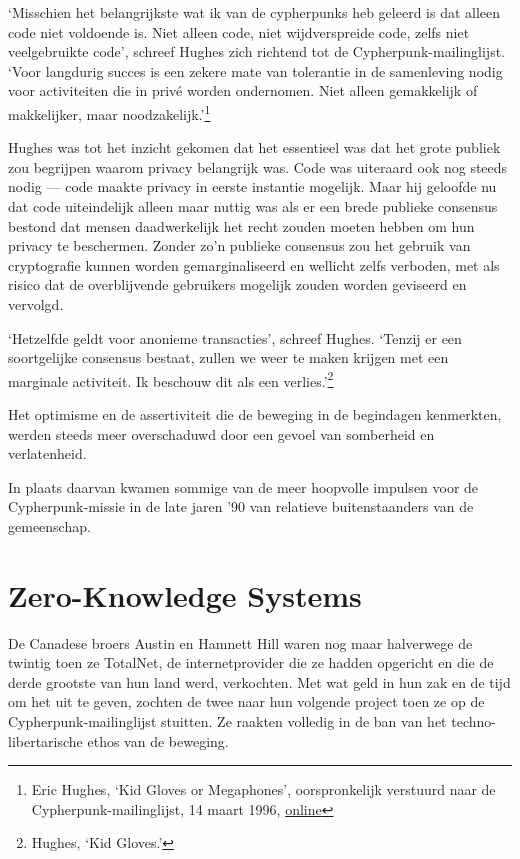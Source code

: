 \documentclass[
  a5paper,
  smalldemyvopaper,11pt,twoside,onecolumn,openright,extrafontsizes]{memoir}
\begin{document}
`Misschien het belangrijkste wat ik van de cypherpunks heb geleerd is
dat alleen code niet voldoende is. Niet alleen code, niet wijdverspreide
code, zelfs niet veelgebruikte code', schreef Hughes zich richtend tot
de Cypherpunk-mailinglijst. `Voor langdurig succes is een zekere mate
van tolerantie in de samenleving nodig voor activiteiten die in privé
worden ondernomen. Niet alleen gemakkelijk of makkelijker, maar
noodzakelijk.'\footnote{Eric Hughes, `Kid Gloves or Megaphones',
  oorspronkelijk verstuurd naar de Cypherpunk-mailinglijst, 14 maart
  1996,
  \href{https://cypherpunks.venona.com/date/1996/03/msg00932.html}{online}}

Hughes was tot het inzicht gekomen dat het essentieel was dat het grote
publiek zou begrijpen waarom privacy belangrijk was. Code was uiteraard
ook nog steeds nodig --- code maakte privacy in eerste instantie
mogelijk. Maar hij geloofde nu dat code uiteindelijk alleen maar nuttig
was als er een brede publieke consensus bestond dat mensen daadwerkelijk
het recht zouden moeten hebben om hun privacy te beschermen. Zonder zo'n
publieke consensus zou het gebruik van cryptografie kunnen worden
gemarginaliseerd en wellicht zelfs verboden, met als risico dat de
overblijvende gebruikers mogelijk zouden worden geviseerd en vervolgd.

`Hetzelfde geldt voor anonieme transacties', schreef Hughes. `Tenzij er
een soortgelijke consensus bestaat, zullen we weer te maken krijgen met
een marginale activiteit. Ik beschouw dit als een verlies.'\footnote{Hughes,
  `Kid Gloves.'}

Het optimisme en de assertiviteit die de beweging in de begindagen
kenmerkten, werden steeds meer overschaduwd door een gevoel van
somberheid en verlatenheid.

In plaats daarvan kwamen sommige van de meer hoopvolle impulsen voor de
Cypherpunk-missie in de late jaren '90 van relatieve buitenstaanders van
de gemeenschap.

\section{Zero-Knowledge Systems}\label{zero-knowledge-systems}

De Canadese broers Austin en Hamnett Hill waren nog maar halverwege de
twintig toen ze TotalNet, de internetprovider die ze hadden opgericht en
die de derde grootste van hun land werd, verkochten. Met wat geld in hun
zak en de tijd om het uit te geven, zochten de twee naar hun volgende
project toen ze op de Cypherpunk-mailinglijst stuitten. Ze raakten
volledig in de ban van het techno-libertarische ethos van de beweging.
\end{document}
